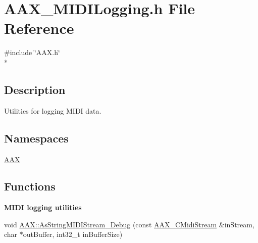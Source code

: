 \hypertarget{a00269}{}\section{A\+A\+X\+\_\+\+M\+I\+D\+I\+Logging.\+h File Reference}
\label{a00269}
{\ttfamily \#include \char`\"{}A\+A\+X.\+h\char`\"{}}\\*


\subsection{Description}
Utilities for logging M\+I\+D\+I data. 

\subsection*{Namespaces}
\begin{DoxyCompactItemize}
\item 
 \hyperlink{a00288}{A\+A\+X}
\end{DoxyCompactItemize}
\subsection*{Functions}
\begin{Indent}{\bf M\+I\+D\+I logging utilities}\par
\begin{DoxyCompactItemize}
\item 
void \hyperlink{a00370_ga5b2751acd531f46a0e4dd68cd0863f46}{A\+A\+X\+::\+As\+String\+M\+I\+D\+I\+Stream\+\_\+\+Debug} (const \hyperlink{a00025}{A\+A\+X\+\_\+\+C\+Midi\+Stream} \&in\+Stream, char $\ast$out\+Buffer, int32\+\_\+t in\+Buffer\+Size)
\end{DoxyCompactItemize}
\end{Indent}
